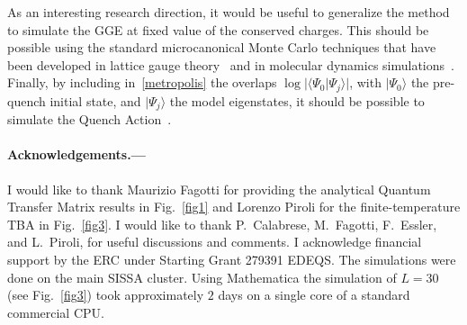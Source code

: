 \documentclass[twocolumn,superscriptaddress,prb,10pt]{revtex4-1}
\begin{document}
As an interesting research direction, it would be useful to generalize the 
method to simulate the GGE at fixed value of the conserved charges. This should be possible 
using the standard microcanonical Monte Carlo techniques that have been developed in lattice 
gauge theory~\cite{creutz-1983} and in molecular dynamics simulations~\cite{lustig-1998}. 
Finally, by including in~\eqref{metropolis} the overlaps  
$\log|\langle\Psi_0|\Psi_j\rangle|$, with $|\Psi_0\rangle$ the pre-quench initial state, 
and $|\Psi_j\rangle$ the model eigenstates,  it should be possible to simulate the 
Quench Action~\cite{prep}. 

\paragraph*{Acknowledgements.---}
I would like to thank Maurizio Fagotti for providing the analytical Quantum Transfer Matrix 
results in Fig.~\ref{fig1} and Lorenzo Piroli for the finite-temperature TBA in Fig.~\ref{fig3}. 
I would like to thank P.~Calabrese, M.~Fagotti, F.~Essler, and L.~Piroli,  for useful 
discussions and comments. I acknowledge financial support by the ERC under Starting 
Grant 279391 EDEQS. The simulations were done on the main SISSA cluster. Using Mathematica 
the simulation of $L=30$ (see Fig.~\ref{fig3}) took approximately $2$ days on a single core 
of a standard commercial CPU. 

\end{document}
